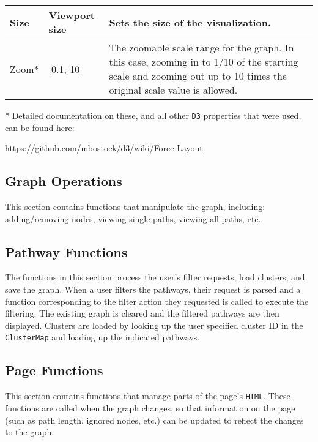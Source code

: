\documentclass{article}
\begin{document}
{\begin{center}
\begin{tabular}{|p{1.75cm}|p{1.75cm}|p{10.5cm}|}
					\hline

					Size 		& Viewport size & Sets the size of the
					visualization.\\

					\hline

					Zoom* 		& [0.1, 10] & The zoomable scale range for the
					graph. In this case, zooming in to 1/10 of the starting
					scale and zooming out up to 10 times the original scale
					value is allowed.\\

					\hline

				\end{tabular}\end{center}

				* Detailed documentation on these, and all other \texttt{D3}
				properties that were used, can be found here:

				\indent\url{https://github.com/mbostock/d3/wiki/Force-Layout}
			}

			\subsection{Graph Operations}{
			This section contains functions that manipulate the graph,
			including: adding/removing nodes, viewing single paths, viewing
			all paths, etc.
			}

			\subsection{Pathway Functions}{
			The functions in this section process the user's filter requests,
			load clusters, and save the graph. When a user filters the
			pathways, their request is parsed and a function corresponding to
			the filter action they requested is called to execute the 
			filtering. The existing graph is cleared and the filtered pathways 
			are then displayed. Clusters are loaded by looking up the user
			specified cluster ID in the \texttt{ClusterMap} and loading up the
			indicated pathways.
			}

			\subsection{Page Functions}{
			This section contains functions that manage parts of the page's
			\texttt{HTML}. These functions are called when the graph changes,
			so that information on the page (such as path length, ignored
			nodes, etc.) can be updated to reflect the changes to the graph.
			}
\end{document}
